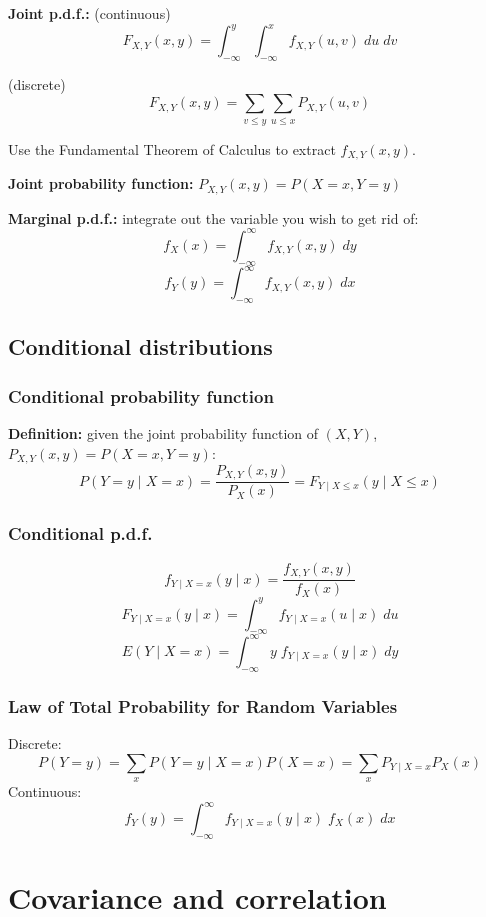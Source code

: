 \documentclass[15pt]{article}
\begin{document}
\textbf{Joint p.d.f.:} (continuous)
\[
    F_{X,Y} (x,y) = \int_{-\infty}^y \int_{-\infty}^x f_{X,Y} (u,v) \; du \; dv
\]

(discrete)
\[
    F_{X,Y} (x,y) = \sum_{v \leq y} \sum_{u \leq x} P_{X,Y} (u,v)
\]

Use the Fundamental Theorem of Calculus to extract $f_{X,Y} (x,y)$.

\textbf{Joint probability function:} $P_{X,Y} (x,y) = P(X=x, Y=y)$

\textbf{Marginal p.d.f.:} integrate out the variable you wish to get rid of:
\[
    f_X (x) = \int_{-\infty}^{\infty} f_{X,Y} (x,y) \; dy
\]
\[
    f_Y (y) = \int_{-\infty}^{\infty} f_{X,Y} (x,y) \; dx
\]

\subsection{Conditional distributions}
\subsubsection{Conditional probability function}
\textbf{Definition:} given the joint probability function of $(X,Y)$, $P_{X,Y} (x,y) = P(X = x, Y = y)$:
\[
    P(Y = y \; | \; X = x) = \frac{P_{X,Y} (x,y)}{P_X (x)} = F_{Y \; | \; X \leq x} (y \; | \; X \leq x)
\]

\subsubsection{Conditional p.d.f.}
\[
    f_{Y \; | \; X = x} (y \; | \; x) = \frac{f_{X,Y} (x,y)}{f_X (x)}
\]
\[
    F_{Y \; | \; X = x} (y \; | \; x) = \int_{-\infty}^y f_{Y \; | \; X =x} (u \; | \; x) \; du
\]
\[
    E(Y \; | \; X = x) = \int_{-\infty}^{\infty} y \; f_{Y \; | \; X =x} (y \; | \; x) \; dy   
\]

\subsubsection{Law of Total Probability for Random Variables}
Discrete:
\[
    P(Y = y) = \sum_{x} P(Y = y \; | \; X = x) P(X = x) = \sum_x P_{Y \; | \; X = x} P_X (x)
\]
Continuous:
\[
    f_Y (y) = \int_{-\infty}^{\infty} f_{Y \; | \; X = x} (y \; | \; x) \; f_X (x) \; dx
\]

\section{Covariance and correlation}
\end{document}
